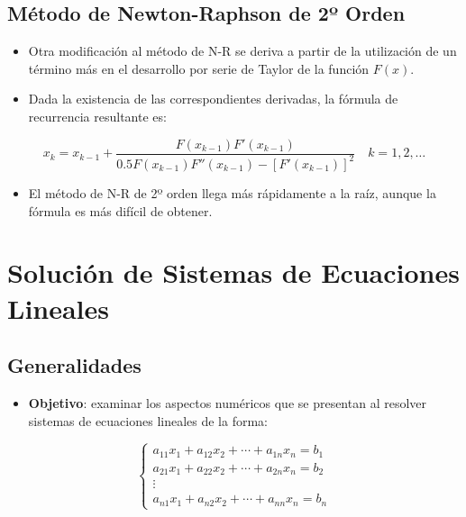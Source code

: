 \documentclass[]{book}
\providecommand{\tightlist}{%
  \setlength{\itemsep}{0pt}\setlength{\parskip}{0pt}}
\begin{document}
\hypertarget{muxe9todo-de-newton-raphson-de-2uxba-orden}{%
\section{Método de Newton-Raphson de 2º Orden}\label{muxe9todo-de-newton-raphson-de-2uxba-orden}}

\begin{itemize}
\tightlist
\item
  Otra modificación al método de N-R se deriva a partir de la utilización de un término más en el desarrollo por serie de Taylor de la función \(F(x)\).
\item
  Dada la existencia de las correspondientes derivadas, la fórmula de recurrencia resultante es:
\end{itemize}

\[
x_k = x_{k-1} + \frac{F(x_{k-1})F'(x_{k-1})}{0.5 F(x_{k-1}) F''(x_{k-1}) - [F'(x_{k-1})]^2} \quad k = 1, 2, \dots
\]

\begin{itemize}
\tightlist
\item
  El método de N-R de 2º orden llega más rápidamente a la raíz, aunque la fórmula es más difícil de obtener.
\end{itemize}

\hypertarget{soluciuxf3n-de-sistemas-de-ecuaciones-lineales}{%
\chapter{Solución de Sistemas de Ecuaciones Lineales}\label{soluciuxf3n-de-sistemas-de-ecuaciones-lineales}}

\hypertarget{generalidades-1}{%
\section{Generalidades}\label{generalidades-1}}

\begin{itemize}
\tightlist
\item
  \textbf{Objetivo}: examinar los aspectos numéricos que se presentan al resolver sistemas de ecuaciones lineales de la forma:
\end{itemize}

\[
\begin{cases} 
a_{11}x_1 + a_{12}x_2 + \cdots + a_{1n}x_n = b_1 \\
a_{21}x_1 + a_{22}x_2 + \cdots + a_{2n}x_n = b_2 \\
\vdots \\
a_{n1}x_1 + a_{n2}x_2 + \cdots + a_{nn}x_n = b_n
\end{cases}
\]
\end{document}

